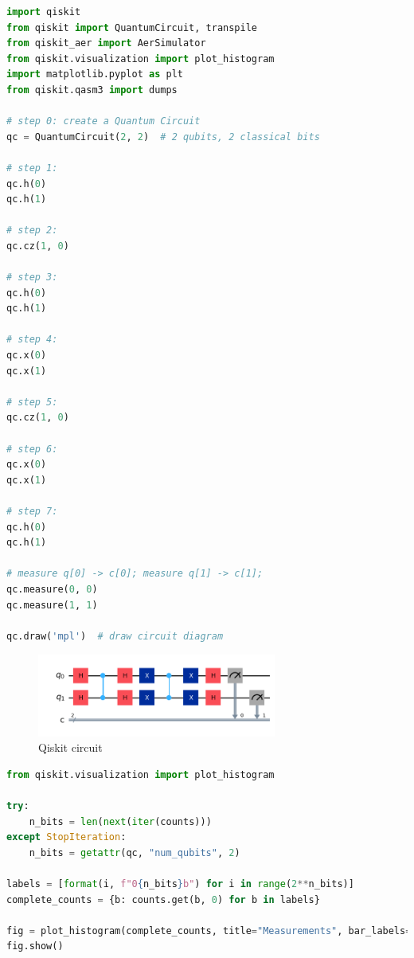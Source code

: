 \begin{lstlisting}[language=Python, caption={Qiskit code}, label={lst:qiskit-circuit}]
import qiskit
from qiskit import QuantumCircuit, transpile
from qiskit_aer import AerSimulator
from qiskit.visualization import plot_histogram
import matplotlib.pyplot as plt
from qiskit.qasm3 import dumps

# step 0: create a Quantum Circuit
qc = QuantumCircuit(2, 2)  # 2 qubits, 2 classical bits

# step 1:
qc.h(0)
qc.h(1)

# step 2:
qc.cz(1, 0)

# step 3:
qc.h(0)
qc.h(1)

# step 4:
qc.x(0)
qc.x(1)

# step 5:
qc.cz(1, 0)

# step 6:
qc.x(0)
qc.x(1)

# step 7:
qc.h(0)
qc.h(1)

# measure q[0] -> c[0]; measure q[1] -> c[1];
qc.measure(0, 0)
qc.measure(1, 1)

qc.draw('mpl')  # draw circuit diagram
\end{lstlisting}





\begin{figure}[H]
    \centering
    \includegraphics[width=0.7\textwidth]{images/circuit.png}
    \caption{Qiskit circuit}
    \label{fig:qiskit circuit}
\end{figure}

\begin{lstlisting}[language=Python, caption={Histogram with zero-count states}, label={lst:qiskit-hist}]
%matplotlib inline
from qiskit.visualization import plot_histogram

try:
    n_bits = len(next(iter(counts)))
except StopIteration:
    n_bits = getattr(qc, "num_qubits", 2)

labels = [format(i, f"0{n_bits}b") for i in range(2**n_bits)]
complete_counts = {b: counts.get(b, 0) for b in labels}

fig = plot_histogram(complete_counts, title="Measurements", bar_labels=True)
fig.show()
\end{lstlisting}



